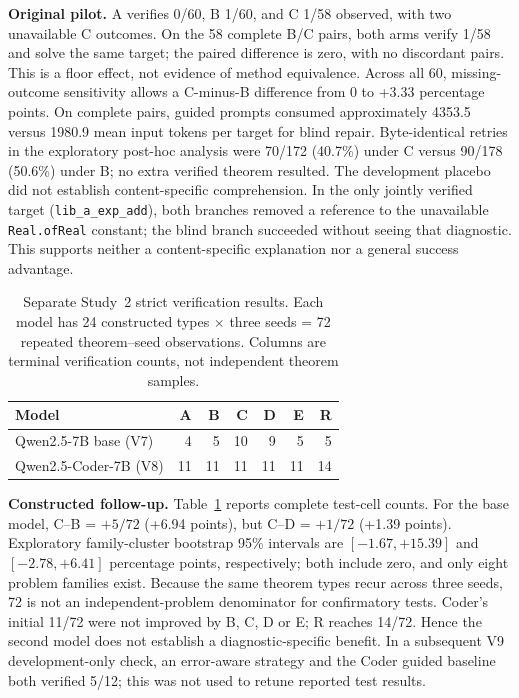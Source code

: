 \documentclass[runningheads,a4paper]{llncs}
\begin{document}
\textbf{Original pilot.} A verifies 0/60, B 1/60, and C 1/58 observed,
with two unavailable C outcomes. On the 58 complete B/C pairs, both
arms verify 1/58 and solve the same target; the paired difference is zero,
with no discordant pairs. This is a floor effect, not evidence of
method equivalence. Across all 60, missing-outcome sensitivity allows a
C-minus-B difference from 0 to +3.33 percentage points. On complete
pairs, guided prompts consumed approximately 4353.5 versus 1980.9 mean
input tokens per target for blind repair. Byte-identical retries in the
exploratory post-hoc analysis were 70/172 (40.7\%) under C versus 90/178
(50.6\%) under B; no extra verified theorem resulted. The development
placebo did not establish content-specific comprehension. In the only
jointly verified target (\texttt{lib\_a\_exp\_add}), both branches removed
a reference to the unavailable \texttt{Real.ofReal} constant; the blind
branch succeeded without seeing that diagnostic. This supports neither a
content-specific explanation nor a general success advantage.

\begin{table}[t]\centering\small
\caption{Separate Study~2 strict verification results. Each model has 24
constructed types $\times$ three seeds = 72 repeated theorem--seed observations.
Columns are terminal verification counts, not independent theorem samples.}
\label{tab:study2}
\begin{tabular}{lrrrrrr}\toprule
Model & A & B & C & D & E & R\\\midrule
Qwen2.5-7B base (V7) &4&5&10&9&5&5\\
Qwen2.5-Coder-7B (V8) &11&11&11&11&11&14\\
\bottomrule\end{tabular}
\end{table}

\textbf{Constructed follow-up.} Table~\ref{tab:study2} reports complete
test-cell counts. For the base model, C--B = $+5/72$ (+6.94 points), but
C--D = $+1/72$ (+1.39 points). Exploratory family-cluster bootstrap
95\% intervals are $[-1.67,+15.39]$ and $[-2.78,+6.41]$ percentage points,
respectively; both include zero, and only eight problem families exist.
Because the same theorem types recur across three seeds, 72 is not an
independent-problem denominator for confirmatory tests. Coder's initial
11/72 were not improved by B, C, D or E; R reaches 14/72. Hence the
second model does not establish a diagnostic-specific benefit. In a
subsequent V9 development-only check, an error-aware strategy and the
Coder guided baseline both verified 5/12; this was not used to retune
reported test results.
\end{document}
